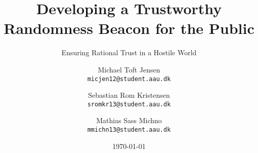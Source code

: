 \newcommand{\TITLE}{Developing a Trustworthy Randomness Beacon for the Public}
\newcommand{\SUBTITLE}{Ensuring Rational Trust in a Hostile World}
\newcommand{\GROUP}{deis1014f18}
\newcommand{\PERIOD}{Spring semester, 2018}
\newcommand{\MEMBERS}{%
    Michael Toft Jensen\\
    Sebastian Rom Kristensen\\
    Mathias Sass Michno
}
\newcommand{\SUPERVISOR}{René Rydhof Hansen\\Stefan Schmid}
\newcommand{\COMPLETION}{June 8, 2018}

\title{\TITLE}
\subtitle{\SUBTITLE}
\author{
    Michael Toft Jensen\\
    \texttt{micjen12@student.aau.dk}
    \and
    Sebastian Rom Kristensen\\
    \texttt{sromkr13@student.aau.dk}
    \and
    Mathias Sass Michno\\
    \texttt{mmichn13@student.aau.dk}
}
\date{\today}
